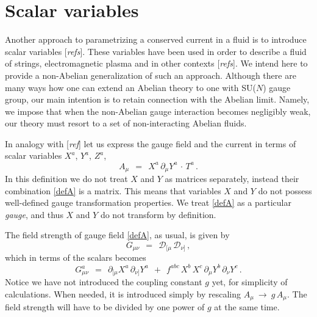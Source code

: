 \documentclass[epsfig,12pt]{article}
\def\beq{\begin{equation}}
\def\eeq{\end{equation}}
\newcommand{\p}{\partial}
\newcommand{\md}{\mathcal{D}}
\begin{document}
\section{Scalar variables}

	Another approach to parametrizing a conserved current in a fluid is to introduce scalar variables [{\it refs}].
	These variables have been used in order to describe a fluid of strings, electromagnetic plasma and in other contexts [{\it refs}].
	We intend here to provide a non-Abelian generalization of such an approach.
        Although there are many ways how one can extend an Abelian theory to one with SU($ N $) gauge group,
        our main intention is to retain connection with the Abelian limit.
        Namely, we impose that when the non-Abelian gauge interaction becomes negligibly weak,
        our theory must resort to a set of non-interacting Abelian fluids.
        
        In analogy with [{\it ref}] let us express the gauge field and the current
        in terms of scalar variables $ X^a $, $ Y^a $, $ Z^a $,
\beq
\label{defA}
        A_\mu    ~~=~~    X^a\, \p_\mu Y^a\, \cdot\, T^a\,.
\eeq
        In this definition we do not treat $ X $ and $ Y $ as matrices separately, instead their combination \eqref{defA} is a matrix.
        This means that variables $ X $ and $ Y $ do not possess well-defined gauge transformation properties.
        We treat \eqref{defA} as a particular \emph{gauge}, and thus $ X $ and $ Y $ do not transform by definition.

	The field strength of gauge field \eqref{defA}, as usual, is given by
\beq
\label{defG}
	G_{\mu\nu}    ~~=~~    \md_{[\mu}\, \md_{\nu]}\,,
\eeq
	which in terms of the scalars becomes
\beq
\label{Ga}
	G{}_{\mu\nu}^a    ~~=~~    \p_{[\mu} X^a\, \p_{\nu]} Y^a  ~~+~~
				   f^{abc}\, X^b\, X^c\, \p_\mu Y^b\, \p_\nu Y^c\,.
\eeq
        Notice we have not introduced the coupling constant $ g $ yet, for simplicity of calculations.
	When needed, it is introduced simply by rescaling $ A_\mu ~\to~ g\, A_\mu $.
	The field strength will have to be divided by one power of $ g $ at the same time.
\end{document}
